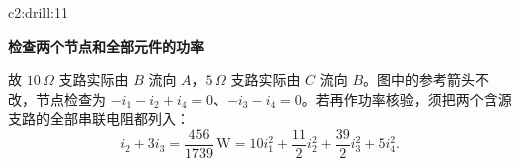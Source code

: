 \begin{drillsolution}{c2:drill:11}
\par\medskip{}\noindent\textbf{检查两个节点和全部元件的功率}\par\nobreak
故 $10\,\Omega$ 支路实际由 $B$ 流向 $A$，$5\,\Omega$ 支路实际由 $C$ 流向 $B$。图中的参考箭头不改，节点检查为 $-i_1-i_2+i_4=0$、$-i_3-i_4=0$。若再作功率核验，须把两个含源支路的全部串联电阻都列入：
\[
 i_2+3i_3=\frac{456}{1739}\,\mathrm W
 =10i_1^2+\frac{11}{2}i_2^2+\frac{39}{2}i_3^2+5i_4^2.
\]
\end{drillsolution}
